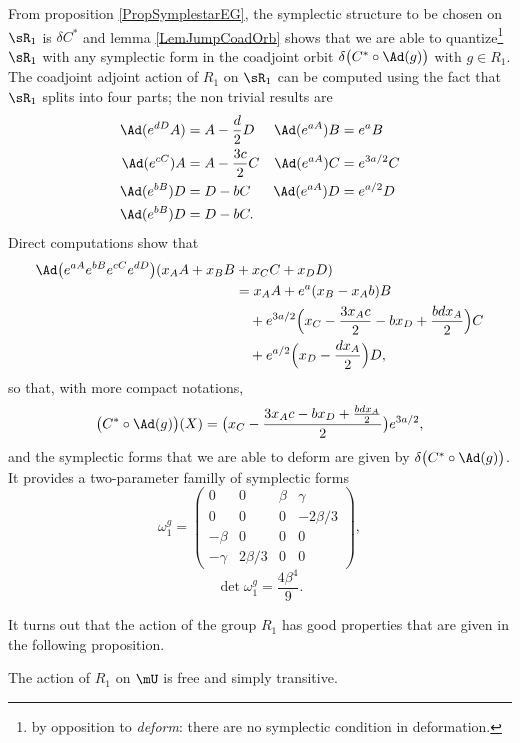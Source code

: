 From proposition \ref{PropSymplestarEG}, the symplectic structure to be chosen on $\sR_1$ is $\delta C^*$ and lemma \ref{LemJumpCoadOrb} shows that we are able to quantize\footnote{by opposition to \emph{deform}: there are no symplectic condition in deformation.} $\sR_1$ with any symplectic form in the coadjoint orbit $\delta\big( C^*\circ\Ad(g) \big)$ with $g\in R_1$. The coadjoint adjoint action of $R_1$ on $\sR_1$ can be computed using the fact that $\sR_1$ splits into four parts; the non trivial results are
\begin{align*}
\Ad( e^{dD}A)&=A-\frac{ d }{2}D         &\Ad( e^{aA})B&= e^{a}B\\
\Ad( e^{cC})A&=A-\frac{ 3c }{2}C        &\Ad( e^{aA})C&= e^{3a/2}C\\
\Ad( e^{bB})D&=D-bC             &\Ad( e^{aA})D&= e^{a/2}D\\
\Ad( e^{bB})D&=D-bC.
\end{align*}
Direct computations show that
\begin{equation}
\begin{split}
    \Ad\big(  e^{aA} e^{bB} e^{cC} e^{dD} \big)(x_AA+x_BB&+x_CC+x_DD)\\
            &=x_AA+ e^{a}(x_B-x_Ab)B\\
            &\quad + e^{3a/2}\Big( x_C-\frac{ 3x_Ac }{2}-bx_D +\frac{ bdx_A }{2} \Big)C\\
            &\quad+ e^{a/2}\Big( x_D-\frac{ dx_A }{2} \Big)D,
\end{split}
\end{equation}
so that, with more compact notations, 
\begin{align}
\big( C^*\circ\Ad(g) \big)(X)=\big( x_C-\frac{ 3x_Ac-bx_D+\frac{ bdx_A }{2} }{2} \big) e^{3a/2},
\end{align}
and the symplectic forms that we are able to deform are given by $\delta\big( C^*\circ\Ad(g) \big)$. It provides a two-parameter familly of symplectic forms
\begin{equation}
\omega_1^g=
\begin{pmatrix}
0&0&\beta&\gamma\\
0&0&0&-2\beta/3\\
-\beta&0&0&0\\
-\gamma&2\beta/3&0&0
\end{pmatrix},
\end{equation}
\[ 
  \det\omega_1^g=\frac{ 4\beta^4 }{ 9 }.
\]



It turns out that the action of the group $R_1$ has good properties that are given in the following proposition.
\begin{proposition}   
The action of $R_1$ on $\mU$ is free and simply transitive.
\label{PropCRunXXX}
\end{proposition}

